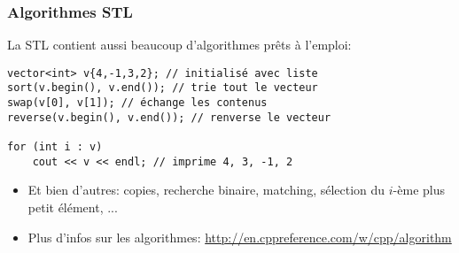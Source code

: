 \documentclass[12pt]{beamer}
\begin{document}
\begin{frame}[fragile]
\frametitle{Algorithmes STL}
La STL contient aussi beaucoup d'algorithmes prêts à l'emploi:
\begin{lstlisting}
vector<int> v{4,-1,3,2}; // initialisé avec liste
sort(v.begin(), v.end()); // trie tout le vecteur
swap(v[0], v[1]); // échange les contenus
reverse(v.begin(), v.end()); // renverse le vecteur

for (int i : v)
    cout << v << endl; // imprime 4, 3, -1, 2
\end{lstlisting}
\begin{itemize}
\item Et bien d'autres: copies, recherche binaire, matching, sélection du $i$-ème plus petit élément, ...
\item Plus d'infos sur les algorithmes: \url{http://en.cppreference.com/w/cpp/algorithm}
\end{itemize}

\end{frame}
\end{document}
